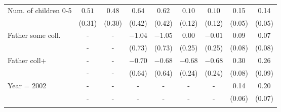 \begin{tabular}{lcccccccc}
Num. of children 0-5&$0.51$&$0.48$&$0.64$&$0.62$&$0.10$&$0.10$&0.15&0.14\\
&(0.31)&(0.30)&(0.42)&(0.42)&(0.12)&(0.12)&(0.05)&(0.05)\\
Father some coll.&-&-&$-1.04$&$-1.05$&$0.00$&$-0.01$&0.09&0.07\\
&-&-&(0.73)&(0.73)&(0.25)&(0.25)&(0.08)&(0.08)\\
Father coll+&-&-&$-0.70$&$-0.68$&$-0.68$&$-0.68$&0.30&0.26\\
&-&-&(0.64)&(0.64)&(0.24)&(0.24)&(0.08)&(0.09)\\
Year = 2002&-&-&-&-&-&-&0.14&0.20\\
&-&-&-&-&-&-&(0.06)&(0.07)\\
\\
\bottomrule\end{tabular}